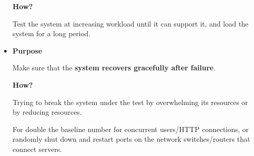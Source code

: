 \begin{itemize}
    \begin{flushleft}
        \textcolor{Green3}{ \textbf{How?}}
    \end{flushleft}
    Test the system at increasing workload until it can support it, and load the system for a long period.


    \item {}
    \begin{flushleft}
        \textcolor{Red2}{ \textbf{Purpose}}
    \end{flushleft}
    Make sure that the \textbf{system recovers gracefully after failure}.

    \begin{flushleft}
        \textcolor{Green3}{ \textbf{How?}}
    \end{flushleft}
    Trying to break the system under the test by overwhelming its resources or by reducing resources.

    For  double the baseline number for concurrent users/HTTP connections, or randomly shut down and restart ports on the network switches/routers that connect servers.
\end{itemize}